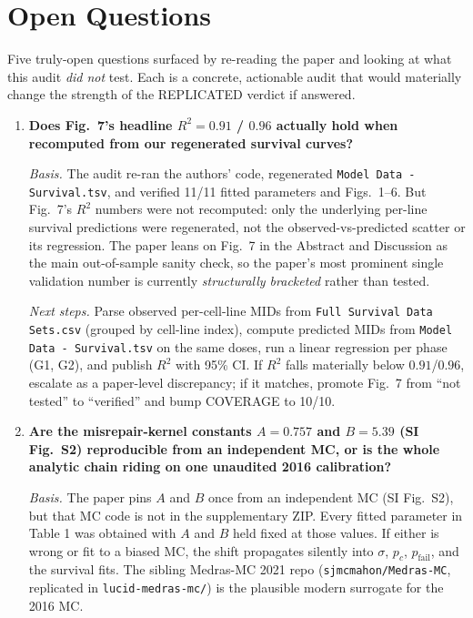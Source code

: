 \section{Open Questions}
\label{sec:open-questions}

Five truly-open questions surfaced by re-reading the paper and looking at
what this audit \emph{did not} test. Each is a concrete, actionable audit
that would materially change the strength of the REPLICATED verdict if
answered.

\begin{enumerate}

\item \textbf{Does Fig.~7's headline $R^2 = 0.91$ / $0.96$ actually hold
      when recomputed from our regenerated survival curves?}

  \emph{Basis.} The audit re-ran the authors' code, regenerated
  \texttt{Model Data - Survival.tsv}, and verified 11/11 fitted parameters
  and Figs.~1--6. But Fig.~7's $R^2$ numbers were not recomputed: only
  the underlying per-line survival predictions were regenerated, not the
  observed-vs-predicted scatter or its regression. The paper leans on
  Fig.~7 in the Abstract and Discussion as the main out-of-sample sanity
  check, so the paper's most prominent single validation number is
  currently \emph{structurally bracketed} rather than tested.

  \emph{Next steps.} Parse observed per-cell-line MIDs from
  \texttt{Full Survival Data Sets.csv} (grouped by cell-line index),
  compute predicted MIDs from \texttt{Model Data - Survival.tsv} on the
  same doses, run a linear regression per phase (G1, G2), and publish
  $R^2$ with 95\% CI. If $R^2$ falls materially below $0.91$/$0.96$,
  escalate as a paper-level discrepancy; if it matches, promote Fig.~7
  from ``not tested'' to ``verified'' and bump COVERAGE to 10/10.

\item \textbf{Are the misrepair-kernel constants $A = 0.757$ and
      $B = 5.39$ (SI Fig.~S2) reproducible from an independent MC, or is
      the whole analytic chain riding on one unaudited 2016
      calibration?}

  \emph{Basis.} The paper pins $A$ and $B$ once from an independent MC
  (SI Fig.~S2), but that MC code is not in the supplementary ZIP. Every
  fitted parameter in Table 1 was obtained with $A$ and $B$ held fixed
  at those values. If either is wrong or fit to a biased MC, the shift
  propagates silently into $\sigma$, $p_c$, $p_{\text{fail}}$, and the
  survival fits. The sibling Medras-MC 2021 repo
  (\texttt{sjmcmahon/Medras-MC}, replicated in \texttt{lucid-medras-mc/})
  is the plausible modern surrogate for the 2016 MC.


\end{enumerate}
